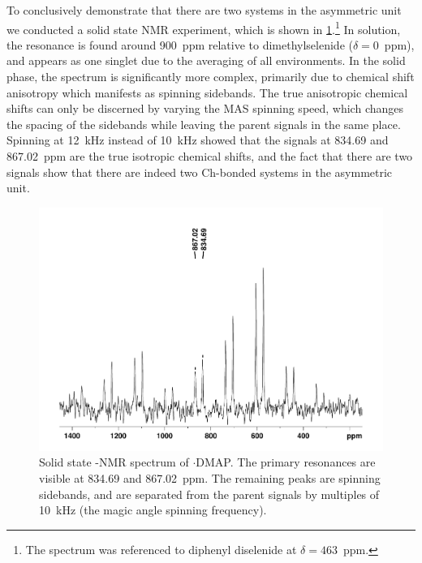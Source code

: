 \begin{refsection}
To conclusively demonstrate that there are two systems in the asymmetric unit we conducted a solid state  NMR experiment, which is shown in \cref{fig:cpmas-sol-77se}.\footnote{The  spectrum was referenced to diphenyl diselenide at $\delta=463$~ppm.}
In solution, the  resonance is found around 900~ppm relative to dimethylselenide ($\delta=0$~ppm), and appears as one singlet due to the averaging of all environments.
In the solid phase, the spectrum is significantly more complex, primarily due to chemical shift anisotropy which manifests as spinning sidebands.
The true anisotropic chemical shifts can only be discerned by varying the MAS spinning speed, which changes the spacing of the sidebands while leaving the parent signals in the same place.
Spinning at 12~kHz instead of 10~kHz showed that the signals at 834.69 and 867.02~ppm are the true isotropic chemical shifts, and the fact that there are two signals show that there are indeed two Ch-bonded systems in the asymmetric unit.

\begin{figure}
    \centering
    \includegraphics[width=0.7\linewidth]{Figures/ebs-4ome-dmap-cpmas-77se.pdf}
    \caption{Solid state -NMR spectrum of $\cdot$DMAP. The primary resonances are visible at 834.69 and 867.02~ppm. The remaining peaks are spinning sidebands, and are separated from the parent signals by multiples of 10~kHz (the magic angle spinning frequency).}
    \label{fig:cpmas-sol-77se}
\end{figure}


\end{refsection}
